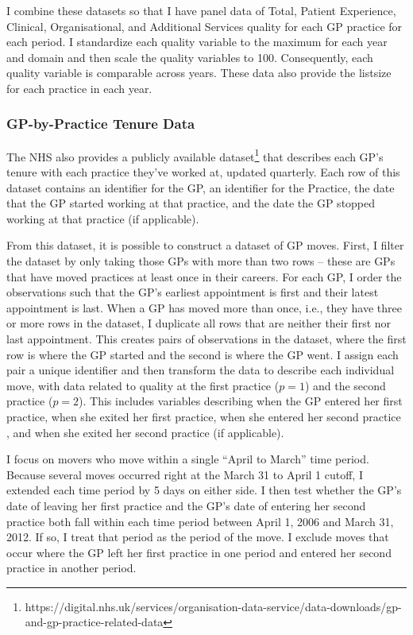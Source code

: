 \documentclass[11pt]{article}
\begin{document}
I combine these datasets so that I have panel data of Total, Patient Experience, Clinical, Organisational, and Additional Services quality for each GP practice for each period. I standardize each quality variable to the maximum for each year and domain and then scale the quality variables to 100. Consequently, each quality variable is comparable across years. These data also provide the listsize for each practice in each year.


\subsubsection{GP-by-Practice Tenure Data}
The NHS also provides a publicly available dataset\footnote{https://digital.nhs.uk/services/organisation-data-service/data-downloads/gp-and-gp-practice-related-data} that describes each GP's tenure with each practice they've worked at, updated quarterly. Each row of this dataset contains an identifier for the GP, an identifier for the Practice, the date that the GP started working at that practice, and the date the GP stopped working at that practice (if applicable).



From this dataset, it is possible to construct a dataset of GP moves. First, I filter the dataset by only taking those GPs with more than two rows -- these are GPs that have moved practices at least once in their careers. For each GP, I order the observations such that the GP's earliest appointment is first and their latest appointment is last. When a GP has moved more than once, i.e., they have three or more rows in the dataset, I duplicate all rows that are neither their first nor last appointment. This creates pairs of observations in the dataset, where the first row is where the GP started and the second is where the GP went. I assign each pair a unique identifier and then transform the data to describe each individual move, with data related to quality at the first practice ($p=1$) and the second practice ($p=2$). This includes variables describing when the GP entered her first practice, when she exited her first practice, when she entered her second practice , and when she exited her second practice (if applicable).

I focus on movers who move within a single ``April to March'' time period. Because several moves occurred right at the March 31 to April 1 cutoff, I extended each time period by 5 days on either side. I then test whether the GP's date of leaving her first practice and the GP's date of entering her second practice both fall within each time period between April 1, 2006 and March 31, 2012. If so, I treat that period as the period of the move. I exclude moves that occur where the GP left her first practice in one period and entered her second practice in another period.
\end{document}
